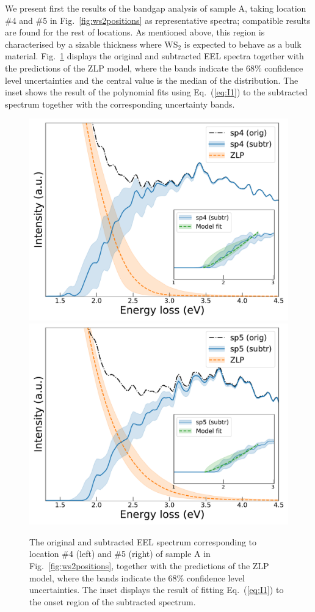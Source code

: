We present first the results of the bandgap analysis of sample A,
taking location \#4 and \#5 in Fig.~\ref{fig:ws2positions} as representative spectra; 
compatible results are found for the rest of locations.
%
As mentioned above, this region is characterised by a sizable thickness where
WS$_2$ is expected to behave as a bulk material.
%
Fig.~\ref{fig:sp14_subtracted_spectrum} displays the original
and subtracted EEL spectra
together with the predictions of the ZLP model, where
the bands indicate the 68\% confidence level uncertainties and the central value
is the median of the distribution.
%
The inset shows the result of the polynomial fits using Eq.~(\ref{eq:I1}) to the subtracted spectrum
together with the corresponding uncertainty bands.

\begin{figure}[H]
\begin{centering}
  \includegraphics[width=0.49\linewidth]{plots/SubtractedEELS_plot_sp14.pdf}
  \includegraphics[width=0.49\linewidth]{plots/SubtractedEELS_plot_sp15.pdf}
   \caption{The original
     and subtracted EEL spectrum corresponding to location \#4 (left) and \#5 (right)
     of sample A in Fig.~\ref{fig:ws2positions},
     together with the predictions of the ZLP model, where
     the bands indicate the 68\% confidence level uncertainties.
     The inset displays the result of fitting Eq.~(\ref{eq:I1}) to the onset
     region of the subtracted spectrum.
  }
\label{fig:sp14_subtracted_spectrum}
\end{centering}
\end{figure}

